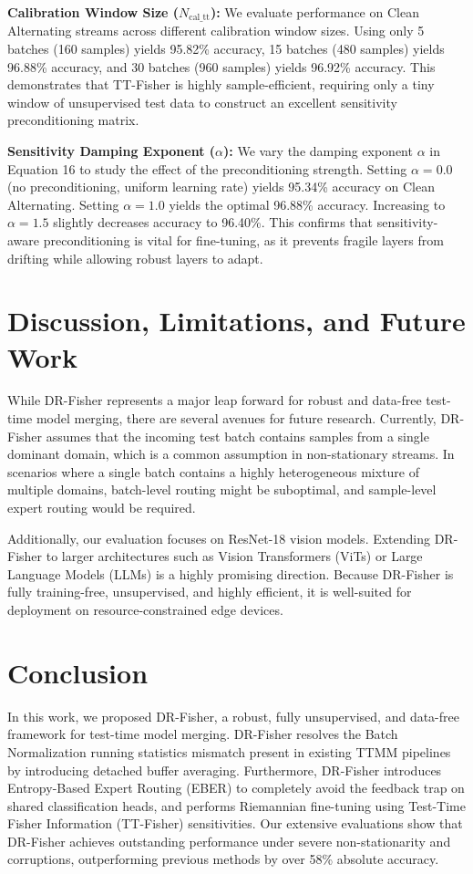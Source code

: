 \documentclass{article}
\theoremstyle{plain}
\theoremstyle{definition}
\theoremstyle{remark}
\begin{document}
\textbf{Calibration Window Size ($N_{\text{cal\_tt}}$):} We evaluate performance on Clean Alternating streams across different calibration window sizes. Using only 5 batches (160 samples) yields 95.82\% accuracy, 15 batches (480 samples) yields 96.88\% accuracy, and 30 batches (960 samples) yields 96.92\% accuracy. This demonstrates that TT-Fisher is highly sample-efficient, requiring only a tiny window of unsupervised test data to construct an excellent sensitivity preconditioning matrix.

\textbf{Sensitivity Damping Exponent ($\alpha$):} We vary the damping exponent $\alpha$ in Equation 16 to study the effect of the preconditioning strength. Setting $\alpha = 0.0$ (no preconditioning, uniform learning rate) yields 95.34\% accuracy on Clean Alternating. Setting $\alpha = 1.0$ yields the optimal 96.88\% accuracy. Increasing to $\alpha = 1.5$ slightly decreases accuracy to 96.40\%. This confirms that sensitivity-aware preconditioning is vital for fine-tuning, as it prevents fragile layers from drifting while allowing robust layers to adapt.

\section{Discussion, Limitations, and Future Work}
\label{submission-discussion}
While DR-Fisher represents a major leap forward for robust and data-free test-time model merging, there are several avenues for future research. Currently, DR-Fisher assumes that the incoming test batch contains samples from a single dominant domain, which is a common assumption in non-stationary streams. In scenarios where a single batch contains a highly heterogeneous mixture of multiple domains, batch-level routing might be suboptimal, and sample-level expert routing would be required.

Additionally, our evaluation focuses on ResNet-18 vision models. Extending DR-Fisher to larger architectures such as Vision Transformers (ViTs) or Large Language Models (LLMs) is a highly promising direction. Because DR-Fisher is fully training-free, unsupervised, and highly efficient, it is well-suited for deployment on resource-constrained edge devices.

\section{Conclusion}
\label{submission-conclusion}
In this work, we proposed DR-Fisher, a robust, fully unsupervised, and data-free framework for test-time model merging. DR-Fisher resolves the Batch Normalization running statistics mismatch present in existing TTMM pipelines by introducing detached buffer averaging. Furthermore, DR-Fisher introduces Entropy-Based Expert Routing (EBER) to completely avoid the feedback trap on shared classification heads, and performs Riemannian fine-tuning using Test-Time Fisher Information (TT-Fisher) sensitivities. Our extensive evaluations show that DR-Fisher achieves outstanding performance under severe non-stationarity and corruptions, outperforming previous methods by over 58\% absolute accuracy.
\end{document}
